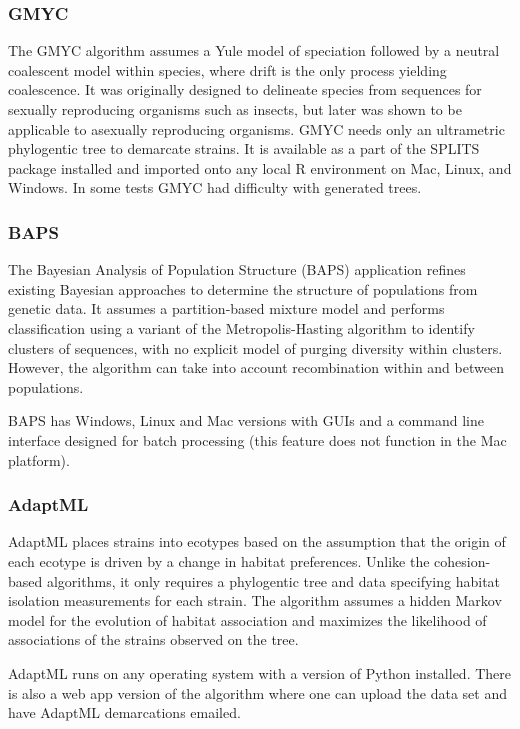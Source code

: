 \subsubsection*{GMYC~\cite{barraclough2009inferring}}
The GMYC algorithm assumes a Yule model of speciation followed by a neutral coalescent model within species, where drift is the only process yielding coalescence.
It was originally designed to delineate species from sequences for sexually reproducing organisms such as insects, but later was shown to be applicable to asexually reproducing organisms.
GMYC needs only an ultrametric phylogentic tree to demarcate strains.
It is available as a part of the SPLITS package installed and imported onto any local R environment on Mac, Linux, and Windows.
In some tests GMYC had difficulty with generated trees.

\subsubsection*{BAPS~\cite{corander2007bayesian}}
The Bayesian Analysis of Population Structure (BAPS) application refines existing Bayesian approaches to determine the structure of populations from genetic data.
It assumes a partition-based mixture model and performs classification using a variant of the Metropolis-Hasting algorithm to identify clusters of sequences, with no explicit model of purging diversity within clusters.
However, the algorithm can take into account recombination within and between populations.

BAPS has Windows, Linux and Mac versions with GUIs and a command line interface designed for batch processing (this feature does not function in the Mac platform).

\subsubsection*{AdaptML~\cite{hunt2008resource}}
AdaptML places strains into ecotypes based on the assumption that the origin of each ecotype is driven by a change in habitat preferences.
Unlike the cohesion-based algorithms, it only requires a phylogentic tree and data specifying habitat isolation measurements for each strain.
The algorithm assumes a hidden Markov model for the evolution of habitat association and maximizes the likelihood of associations of the strains observed on the tree.

AdaptML runs on any operating system with a  version of Python installed. There is also a web app version of the algorithm where one can upload the data set and have AdaptML demarcations emailed.

